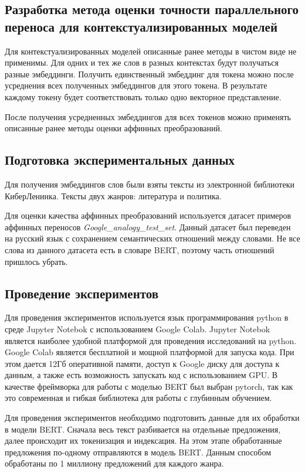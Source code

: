 \documentclass[a4paper,14pt]{article}
\begin{document}
	\subsection{Разработка метода оценки точности параллельного переноса для контекстуализированных моделей}
	
	Для контекстуализированных моделей описанные ранее методы в чистом виде не применимы.
	Для одних и тех же слов в разных контекстах будут получаться разные эмбеддинги.
	Получить единственный эмбеддинг для токена можно после усреднения всех полученных эмбеддингов для этого токена.
	В результате каждому токену будет соответствовать только одно векторное представление.
	
	После получения усредненных эмбеддингов для всех токенов можно применять описанные ранее методы оценки аффинных преобразований.
	
	\subsection{Подготовка экспериментальных данных}
	
	Для получения эмбеддингов слов были взяты тексты из электронной библиотеки КиберЛенинка.
	Тексты двух жанров: литература и политика.
	
	Для оценки качества аффинных преобразований используется датасет примеров аффинных переносов \textit{Google\_analogy\_test\_set}.
	Данный датасет был переведен на русский язык с сохранением семантических отношений между словами.
	Не все слова из данного датасета есть в словаре BERT, поэтому часть отношений пришлось убрать.
	
	\subsection{Проведение экспериментов}
	
	Для проведения экспериментов используется язык программирования python в среде Jupyter Notebok с использованием Google Colab.
	Jupyter Notebok является наиболее удобной платформой для проведения исследований на python.
	Google Colab является бесплатной и мощной платформой для запуска кода.
	При этом дается 12Гб оперативной памяти, доступ к Google диску для доступа к данным, а также есть возможность запускать код с использованием GPU.
	В качестве фреймворка для работы с моделью BERT был выбран pytorch, так как это современная и гибкая библиотека для работы с глубинным обучением.
	
	Для проведения экспериментов необходимо подготовить данные для их обработки в модели BERT.
	Сначала весь текст разбивается на отдельные предложения, далее происходит их токенизация и индексация.
	На этом этапе обработанные предложения по-одному отправляются в модель BERT.
	Данным способом обработаны по 1 миллиону предложений для каждого жанра.
	
\end{document}
